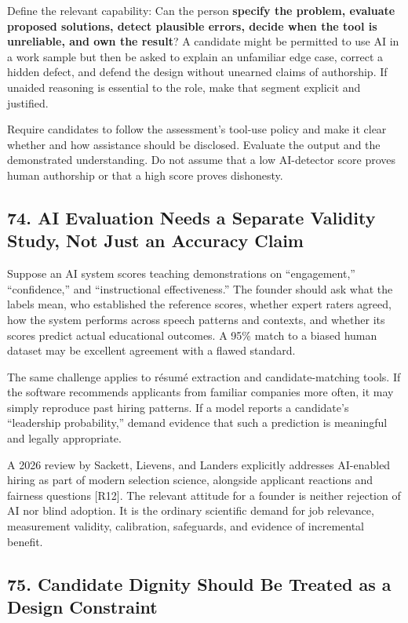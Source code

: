 Define the relevant capability: Can the person \textbf{specify the problem, evaluate proposed solutions, detect plausible errors, decide when the tool is unreliable, and own the result}? A candidate might be permitted to use AI in a work sample but then be asked to explain an unfamiliar edge case, correct a hidden defect, and defend the design without unearned claims of authorship. If unaided reasoning is essential to the role, make that segment explicit and justified.

Require candidates to follow the assessment's tool-use policy and make it clear whether and how assistance should be disclosed. Evaluate the output and the demonstrated understanding. Do not assume that a low AI-detector score proves human authorship or that a high score proves dishonesty.

\subsection*{74. AI Evaluation Needs a Separate Validity Study, Not Just an Accuracy Claim}

Suppose an AI system scores teaching demonstrations on ``engagement,'' ``confidence,'' and ``instructional effectiveness.'' The founder should ask what the labels mean, who established the reference scores, whether expert raters agreed, how the system performs across speech patterns and contexts, and whether its scores predict actual educational outcomes. A 95\% match to a biased human dataset may be excellent agreement with a flawed standard.

The same challenge applies to résumé extraction and candidate-matching tools. If the software recommends applicants from familiar companies more often, it may simply reproduce past hiring patterns. If a model reports a candidate's ``leadership probability,'' demand evidence that such a prediction is meaningful and legally appropriate.

A 2026 review by Sackett, Lievens, and Landers explicitly addresses AI-enabled hiring as part of modern selection science, alongside applicant reactions and fairness questions [R12]. The relevant attitude for a founder is neither rejection of AI nor blind adoption. It is the ordinary scientific demand for job relevance, measurement validity, calibration, safeguards, and evidence of incremental benefit.

\subsection*{75. Candidate Dignity Should Be Treated as a Design Constraint}

